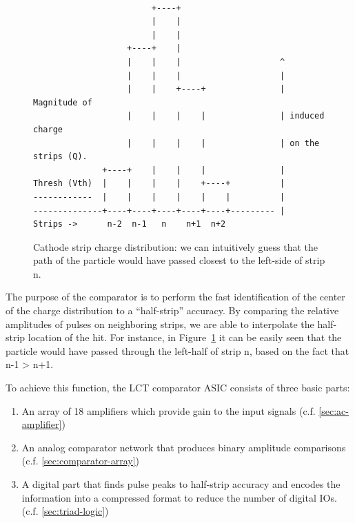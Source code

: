 \documentclass[letterpaper]{article}
\begin{document}
\small
\begin{figure}[H]
\begin{center}
\begin{minipage}{12cm}
\begin{verbatim}

                        +----+
                        |    |
                        |    |
                   +----+    |
                   |    |    |                    ^
                   |    |    |                    |
                   |    |    +----+               | Magnitude of
                   |    |    |    |               | induced charge
                   |    |    |    |               | on the strips (Q).
              +----+    |    |    |               |
Thresh (Vth)  |    |    |    |    +----+          |
------------  |    |    |    |    |    |          |
--------------+----+----+----+----+----+--------- |
Strips ->      n-2  n-1   n    n+1  n+2
\end{verbatim}
\end{minipage}
\end{center}
\caption{Cathode strip charge distribution: we can intuitively guess that the path of the particle would have passed closest to the left-side of strip n.}\label{fig:charge-distribution}
\end{figure}
\normalsize

The purpose of the comparator is to perform the fast identification of the center of the charge distribution to a ``half-strip'' accuracy. By comparing the relative amplitudes of pulses on neighboring strips, we are able to interpolate the half-strip location of the hit. For instance, in Figure~\ref{fig:charge-distribution} it can be easily seen that the particle would have passed through the left-half of strip n, based on the fact that n-1 > n+1.

To achieve this function, the LCT comparator ASIC consists of three basic parts:
\begin{enumerate}
    \item An array of 18 amplifiers which provide gain to the input signals (c.f. \autoref{sec:ac-amplifier})
    \item An analog comparator network that produces binary amplitude comparisons (c.f. \autoref{sec:comparator-array})
    \item A digital part that finds pulse peaks to half-strip accuracy and encodes the information into a compressed format to reduce the number of digital IOs. (c.f. \autoref{sec:triad-logic})
\end{enumerate}
\end{document}
